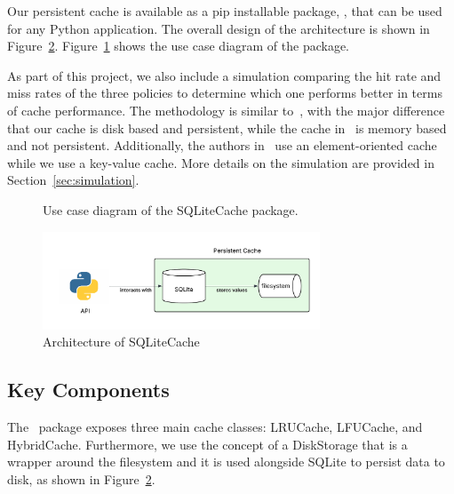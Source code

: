 Our persistent cache is available as a pip installable package,
\sqlitecache, that
can be used for any Python application.
The overall design of the architecture is shown in Figure~\ref{fig:architecture}.
Figure~\ref{fig:use_case_diagram} shows the use case diagram of the package.

As part of this project, we also include a simulation 
comparing the hit rate
and miss rates of the three policies to determine which one performs better
in terms of cache performance. The methodology is similar to~\cite{shah2023ImprovedCacheEviction},
with the major difference that our cache is disk based and persistent,
while the cache in~\cite{shah2023ImprovedCacheEviction} is memory based and not persistent.
Additionally, the authors in~\cite{shah2023ImprovedCacheEviction} use an element-oriented
cache while we use a key-value cache. More details on the simulation
are provided in Section~\ref{sec:simulation}.

\begin{figure}
    \caption{Use case diagram of the SQLiteCache package.}
    \label{fig:use_case_diagram}
\end{figure}

\begin{figure}[ht]
    \centering
    \includegraphics[width=3.25in]{images/overall_architecture.png}
    \caption{Architecture of SQLiteCache}
    \label{fig:architecture}
\end{figure}

\subsection{Key Components}
The \sqlitecache~package exposes three main cache classes: LRUCache, LFUCache, and HybridCache.
Furthermore, we use the concept of a DiskStorage that is a wrapper around the filesystem
and it is used alongside SQLite to persist data to disk, as shown in Figure~\ref{fig:architecture}.

